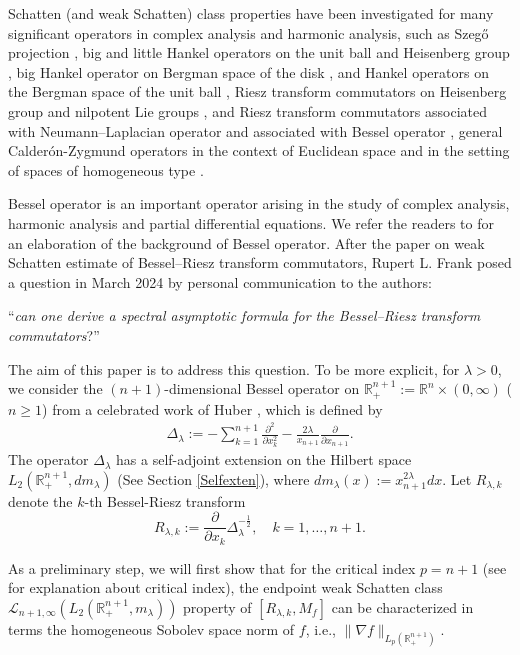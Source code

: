 \documentclass[12pt]{amsart}
\begin{document}
Schatten  (and weak Schatten) class properties have been investigated for many significant operators in complex analysis and harmonic analysis, such as Szeg\H{o} projection \cite{FR}, big and little Hankel operators on the unit ball and  Heisenberg group \cite{FR},  big Hankel operator on Bergman space of the disk  \cite{AFP}, and  Hankel operators on the Bergman space of the unit ball \cite{MR1087805}, Riesz transform commutators on Heisenberg group \cite{MR4552581} and nilpotent Lie groups \cite{MR4756021}, and Riesz transform commutators associated with  Neumann--Laplacian operator \cite{Neumann} and associated with Bessel operator \cite{FLLXarxiv}, general Calder\'{o}n-Zygmund operators in the context of Euclidean space \cite{Zhangwei1,Zhangwei2} and in the setting of spaces of homogeneous type \cite{HRpreprint}.

Bessel operator is an important operator arising in the study of complex analysis, harmonic analysis and partial differential equations. We refer the readers to \cite{MR64284,MS} for an elaboration of the background of Bessel operator. After the paper  \cite{FLLXarxiv} on weak Schatten estimate of Bessel--Riesz transform commutators,
Rupert L. Frank posed a question in March 2024 by personal communication to the authors:

``{\it can one derive a spectral asymptotic formula for the Bessel--Riesz transform commutators}?''

The aim of this paper is to address this question. To be more explicit, for $\lambda> 0$, we consider the $(n+1)$-dimensional Bessel operator on $\mathbb{R}^{n+1}_+:=\mathbb{R}^n\times (0,\infty)$ ($n\geq 1$) from a celebrated work of Huber \cite{MR64284}, which is defined by
\begin{align}\label{Dlambda}
\Delta_\lambda:= -\sum_{k=1}^{n+1}\frac{\partial^2}{\partial x_k^2}-\frac{2\lambda}{x_{n+1}}\frac{\partial}{\partial x_{n+1}}.
\end{align}
The operator $\Delta_\lambda$ has a self-adjoint extension on the Hilbert space $L_2(\mathbb{R}_+^{n+1}, dm_\lambda)$ (See Section \ref{Selfexten}),  where $dm_\lambda(x):=x_{n+1}^{2\lambda}dx.$ Let $R_{\lambda,k}$ denote the $k$-th Bessel-Riesz transform %
$$ R_{\lambda,k} :=\frac{\partial}{\partial x_k} \Delta_\lambda^{-\frac12},\quad k=1,\ldots,n+1. $$


As a preliminary step, we will first show that for the critical index $p=n+1$ (see \cite[Remark 1.6]{FLLXarxiv} for explanation about critical index),  the  endpoint weak Schatten class $\mathcal{L}_{n+1,\infty}(L_2(\mathbb{R}^{n+1}_+,m_{\lambda}))$ property of $[R_{\lambda,k},M_f]$  can be characterized in terms the homogeneous Sobolev space norm of $f$, i.e., $\|\nabla f\|_{L_p(\mathbb{R}_+^{n+1})}$.
\end{document}
